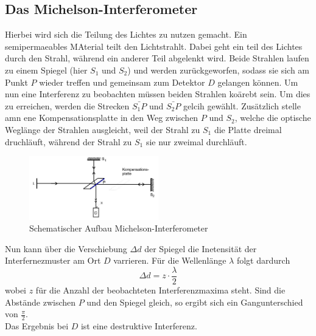 \subsection{Das Michelson-Interferometer}
Hierbei wird sich die Teilung des Lichtes zu nutzen gemacht. Ein semipermaeables MAterial teilt den Lichtstrahlt.
Dabei geht ein teil des Lichtes durch den Strahl, während ein anderer Teil abgelenkt wird.
Beide Strahlen laufen zu einem Spiegel (hier $S_1$ und $S_2$) und werden zurückgeworfen, sodass sie sich am Punkt $P$
wieder treffen und gemeinsam zum Detektor $D$ gelangen können.
Um nun eine Interferenz zu beobachten müssen beiden Strahlen koärebt sein.
Um dies zu erreichen, werden die Strecken $\bar{S_1P}$ und $\bar{S_2P}$ gelcih gewählt. Zusätzlich stelle amn ene Kompensationsplatte 
in den Weg zwischen $P$ und $S_2$, welche die optische Weglänge der Strahlen ausgleicht, weil der Strahl zu $S_1$ die Platte dreimal druchläuft,
während der Strahl zu $S_1$ sie nur zweimal durchläuft.\\
\begin{figure}
    \centering
    \includegraphics[width=0.5\textwidth]{bilder/s.jpg}
    \caption{Schematischer Aufbau Michelson-Interferometer \cite[9]{anleitung}}
\end{figure}
Nun kann über die Verschiebung $\Delta d$ der Spiegel die Inetensität der Interfernezmuster am Ort $D$
varrieren. Für die Wellenlänge $\lambda$ folgt dardurch
\begin{equation}
    \Delta d = z \cdot \frac{\lambda}{2}
\end{equation}
wobei $z$ für die Anzahl der beobachteten Interferenzmaxima steht.
Sind die Abstände zwischen $P$ und den Spiegel gleich, so ergibt sich ein Gangunterschied von $\frac{\pi}{2}$.\\
Das Ergebnis bei $D$ ist eine destruktive Interferenz.


